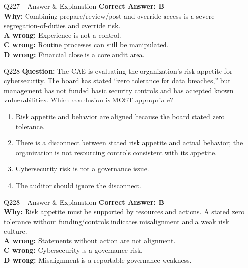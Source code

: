 \documentclass[aspectratio=169,10pt]{beamer}
\begin{document}
	\begin{frame}[t]{Q227 -- Answer \& Explanation}
		\small
		\textbf{Correct Answer: B} \\[4pt]
		\textbf{Why:} Combining prepare/review/post and override access is a severe segregation-of-duties and override risk. \\[4pt]
		\textbf{A wrong:} Experience is not a control. \\[2pt]
		\textbf{C wrong:} Routine processes can still be manipulated. \\[2pt]
		\textbf{D wrong:} Financial close is a core audit area.
	\end{frame}
	
	\begin{frame}[t]{Q228}
		\small
		\textbf{Question:} The CAE is evaluating the organization's risk appetite for cybersecurity. The board has stated ``zero tolerance for data breaches,'' but management has not funded basic security controls and has accepted known vulnerabilities. Which conclusion is MOST appropriate?
		\begin{enumerate}[label=\Alph*.,itemsep=1pt,topsep=2pt]
			\item Risk appetite and behavior are aligned because the board stated zero tolerance.
			\item There is a disconnect between stated risk appetite and actual behavior; the organization is not resourcing controls consistent with its appetite.
			\item Cybersecurity risk is not a governance issue.
			\item The auditor should ignore the disconnect.
		\end{enumerate}
	\end{frame}
	
	\begin{frame}[t]{Q228 -- Answer \& Explanation}
		\small
		\textbf{Correct Answer: B} \\[4pt]
		\textbf{Why:} Risk appetite must be supported by resources and actions. A stated zero tolerance without funding/controls indicates misalignment and a weak risk culture. \\[4pt]
		\textbf{A wrong:} Statements without action are not alignment. \\[2pt]
		\textbf{C wrong:} Cybersecurity is a governance risk. \\[2pt]
		\textbf{D wrong:} Misalignment is a reportable governance weakness.
	\end{frame}
	
\end{document}

